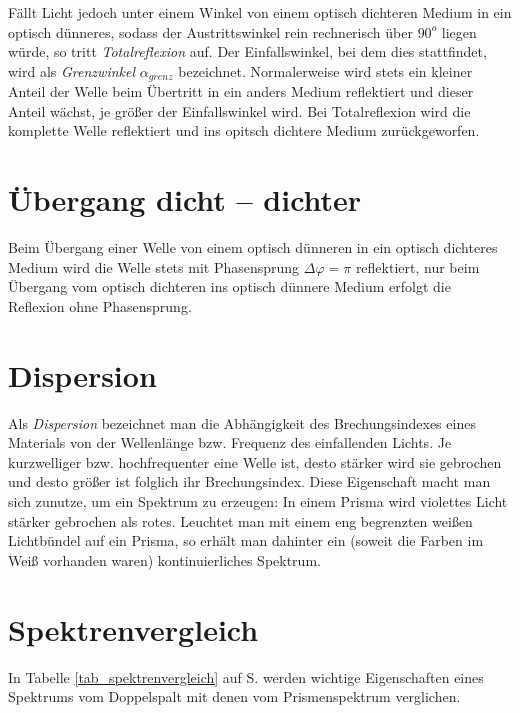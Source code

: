 Fällt Licht jedoch unter einem Winkel von einem optisch dichteren Medium in ein optisch dünneres, sodass der Austrittswinkel rein rechnerisch über \(90^o\) liegen würde, so tritt \textit{Totalreflexion} auf. Der Einfallswinkel, bei dem dies stattfindet, wird als \textit{Grenzwinkel} \(\alpha_{grenz}\) bezeichnet. Normalerweise wird stets ein kleiner Anteil der Welle beim Übertritt in ein anders Medium reflektiert und dieser Anteil wächst, je größer der Einfallswinkel wird. Bei Totalreflexion wird die komplette Welle reflektiert und ins opitsch dichtere Medium zurückgeworfen.



	\section{Übergang dicht -- dichter}

Beim Übergang einer Welle von einem optisch dünneren in ein optisch dichteres Medium wird die Welle stets mit Phasensprung \(\Delta \varphi = \pi\) reflektiert, nur beim Übergang vom optisch dichteren ins optisch dünnere Medium erfolgt die Reflexion ohne Phasensprung.



	\section{Dispersion}

Als \textit{Dispersion} bezeichnet man die Abhängigkeit des Brechungsindexes eines Materials von der Wellenlänge bzw. Frequenz des einfallenden Lichts. Je kurzwelliger bzw. hochfrequenter eine Welle ist, desto stärker wird sie gebrochen und desto größer ist folglich ihr Brechungsindex. Diese Eigenschaft macht man sich zunutze, um ein Spektrum zu erzeugen: In einem Prisma wird violettes Licht stärker gebrochen als rotes. Leuchtet man mit einem eng begrenzten weißen Lichtbündel auf ein Prisma, so erhält man dahinter ein (soweit die Farben im Weiß vorhanden waren) kontinuierliches Spektrum.





	\section{Spektrenvergleich}

In Tabelle \ref{tab_spektrenvergleich} auf S. \pageref{tab_spektrenvergleich} werden wichtige Eigenschaften eines Spektrums vom Doppelspalt mit denen vom Prismenspektrum verglichen.

